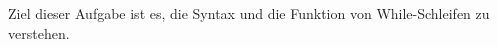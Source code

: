 

Ziel dieser Aufgabe ist es, die Syntax und die Funktion von While-Schleifen zu verstehen.

\addexcercise
\addexcercise
